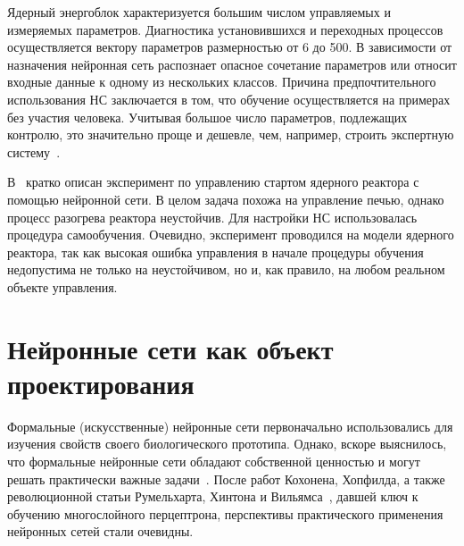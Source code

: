 Ядерный энергоблок характеризуется большим числом управляемых и
измеряемых параметров.  Диагностика установившихся и переходных
процессов осуществляется вектору параметров размерностью от 6 до 500.
В зависимости от назначения нейронная сеть распознает опасное
сочетание параметров или относит входные данные к одному из нескольких
классов.  Причина предпочтительного использования НС заключается в
том, что обучение осуществляется на примерах без участия человека.
Учитывая большое число параметров, подлежащих контролю, это
значительно проще и дешевле, чем, например, строить экспертную
систему~\cite{basubart94}.

В~\cite{uhrig91} кратко описан эксперимент по управлению стартом
ядерного реактора с помощью нейронной сети.  В целом задача похожа на
управление печью, однако процесс разогрева реактора неустойчив.  Для
настройки НС использовалась процедура самообучения.  Очевидно,
эксперимент проводился на модели ядерного реактора, так как высокая
ошибка управления в начале процедуры обучения недопустима не только на
неустойчивом, но и, как правило, на любом реальном объекте управления.

\section{Нейронные сети как объект проектирования}


Формальные (искусственные) нейронные сети первоначально использовались
для изучения свойств своего биологического прототипа.  Однако, вскоре
выяснилось, что формальные нейронные сети обладают собственной
ценностью и могут решать практически важные задачи~\cite{wasser92}.
После работ Кохонена, Хопфилда, а также революционной статьи
Румельхарта, Хинтона и Вильямса~\cite{rumelhart86}, давшей ключ к
обучению многослойного перцептрона, перспективы практического
применения нейронных сетей стали очевидны.

